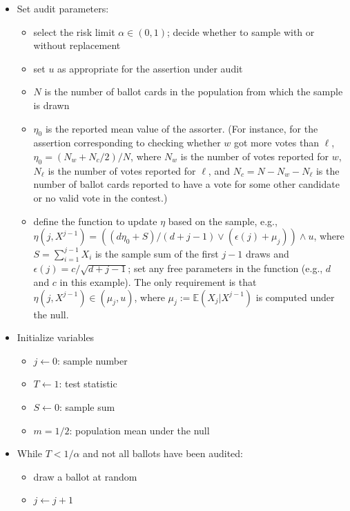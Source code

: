 \documentclass[12pt,runningheads]{llncs}
\newcommand{\EE}{\mathbb{E}}
\begin{document}
{\begin{itemize}
   \item Set audit parameters:
       \begin{itemize}
          \item select the risk limit $\alpha \in (0, 1)$; decide whether to sample with or without replacement
          \item set $u$ as appropriate for the assertion under audit
          \item $N$ is the number of ballot cards in the population from which the sample is drawn
          \item $\eta_0$ is the reported mean value of the assorter. (For instance, for the assertion corresponding
          to checking whether $w$ got more votes than $\ell$,  $\eta_0 = (N_w + N_c/2)/N$, where $N_w$ is the number of
          votes reported for $w$, $N_\ell$ is the number of votes reported for $\ell$, and $N_c = N-N_w-N_\ell$ is the number
          of ballot cards reported to have a vote for some other candidate or no valid vote in the contest.)
          \item define the function to update $\eta$ based on the sample, e.g., \\
          $\eta(j, X^{j-1}) = \left ( (d\eta_0 + S)/(d+j-1) \vee (\epsilon(j)+ \mu_j) \right ) \wedge u$, where
          $S = \sum_{i=1}^{j-1}X_i$ is the sample sum of the first $j-1$ draws and $\epsilon(j) = c/\sqrt{d+j-1}$;
          set any free parameters in the function (e.g., $d$ and $c$ in this example).
          The only requirement is that $\eta(j, X^{j-1}) \in (\mu_j, u)$, where $\mu_j := \EE (X_j | X^{j-1})$ is computed under the null.
      \end{itemize}
    \item Initialize variables
        \begin{itemize}
          \item $j \leftarrow 0$: sample number
          \item $T \leftarrow 1$: test statistic
          \item $S \leftarrow 0$: sample sum
          \item $m = 1/2$: population mean under the null
      \end{itemize}
   \item While $T < 1/\alpha$ and not all ballots have been audited:
   \begin{itemize}
        \item draw a ballot at random
        \item $j \leftarrow j+1$

\end{itemize}
\end{itemize}}
\end{document}
